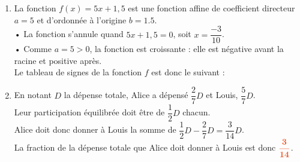 \documentclass[a4paper,11pt]{article}
\begin{document}
{\begin{seanceD}{}
\begin{enumerate}
   La solution de cette équation est  ${\color[HTML]{f15929}\boldsymbol{\dfrac{7}{5}}}$.


\item 
 La fonction $f(x) = 5x+1{,}5$ est une fonction affine de coefficient directeur $a = 5$ et d'ordonnée à l'origine $b = 1.5$.\\
    • La fonction s'annule quand $5x+1{,}5 = 0$, soit $x = \dfrac{-3}{10}$.\\
    • Comme $a = 5 > 0$, la fonction est croissante : elle est négative avant la racine et positive après.\\
    Le tableau de signes de la fonction $f$ est donc le suivant :\\

\item 
 En notant $D$ la dépense totale, Alice a dépensé $\dfrac{2}{7}D$ et Louis, $\dfrac{5}{7}D$.\\
Leur participation équilibrée doit être de $\dfrac{1}{2}D$ chacun.\\
Alice doit donc donner à Louis la somme de $\dfrac{1}{2}D - \dfrac{2}{7}D = \dfrac{3}{14}D$.\\
La fraction de la dépense totale que Alice doit donner à Louis est donc ${\color[HTML]{f15929}\boldsymbol{\dfrac{3}{14}}}$.


\end{enumerate}
\end{seanceD}}
\end{document}
